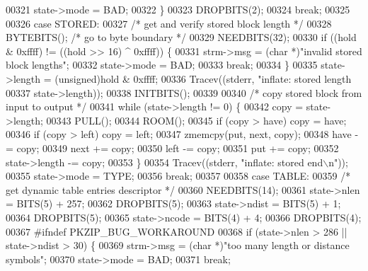 \begin{DoxyCode}
{{{00321                 state->mode = BAD;
00322             \}
00323             DROPBITS(2);
00324             \textcolor{keywordflow}{break};
00325 
00326         \textcolor{keywordflow}{case} STORED:
00327             \textcolor{comment}{/* get and verify stored block length */}
00328             BYTEBITS();                         \textcolor{comment}{/* go to byte boundary */}
00329             NEEDBITS(32);
00330             \textcolor{keywordflow}{if} ((hold & 0xffff) != ((hold >> 16) ^ 0xffff)) \{
00331                 strm->msg = (\textcolor{keywordtype}{char} *)\textcolor{stringliteral}{"invalid stored block lengths"};
00332                 state->mode = BAD;
00333                 \textcolor{keywordflow}{break};
00334             \}
00335             state->length = (unsigned)hold & 0xffff;
00336             Tracev((stderr, \textcolor{stringliteral}{"inflate:       stored length %
00337                     state->length));
00338             INITBITS();
00339 
00340             \textcolor{comment}{/* copy stored block from input to output */}
00341             \textcolor{keywordflow}{while} (state->length != 0) \{
00342                 copy = state->length;
00343                 PULL();
00344                 ROOM();
00345                 \textcolor{keywordflow}{if} (copy > have) copy = have;
00346                 \textcolor{keywordflow}{if} (copy > left) copy = left;
00347                 zmemcpy(put, next, copy);
00348                 have -= copy;
00349                 next += copy;
00350                 left -= copy;
00351                 put += copy;
00352                 state->length -= copy;
00353             \}
00354             Tracev((stderr, \textcolor{stringliteral}{"inflate:       stored end\(\backslash\)n"}));
00355             state->mode = TYPE;
00356             \textcolor{keywordflow}{break};
00357 
00358         \textcolor{keywordflow}{case} TABLE:
00359             \textcolor{comment}{/* get dynamic table entries descriptor */}
00360             NEEDBITS(14);
00361             state->nlen = BITS(5) + 257;
00362             DROPBITS(5);
00363             state->ndist = BITS(5) + 1;
00364             DROPBITS(5);
00365             state->ncode = BITS(4) + 4;
00366             DROPBITS(4);
00367 \textcolor{preprocessor}{#ifndef PKZIP\_BUG\_WORKAROUND}
00368             \textcolor{keywordflow}{if} (state->nlen > 286 || state->ndist > 30) \{
00369                 strm->msg = (\textcolor{keywordtype}{char} *)\textcolor{stringliteral}{"too many length or distance symbols"};
00370                 state->mode = BAD;
00371                 \textcolor{keywordflow}{break};
}}}}
\end{DoxyCode}
